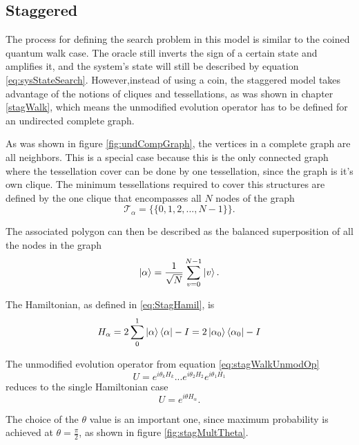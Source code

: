\documentclass[../../dissertation.tex]{subfiles}
\begin{document}
\subsection{Staggered}
The process for defining the search problem in this model is similar to the coined quantum walk case. The oracle still inverts the sign of a certain state and amplifies it, and the system's state will still be described by equation \ref{eq:sysStateSearch}. However,instead of using a coin, the staggered model takes advantage of the notions of cliques and tessellations, as was shown in chapter \ref{stagWalk}, which means the unmodified evolution operator has to be defined for an undirected complete graph.\par
As was shown in figure \ref{fig:undCompGraph}, the vertices in a complete graph are all neighbors. This is a special case because this is the only connected graph where the tessellation cover can be done by one tessellation, since the graph is it's own clique. The minimum tessellations required to cover this structures are defined by the one clique that encompasses all $N$ nodes of the graph
\begin{equation}
	\mathscr{T}_{\alpha} = \{\{0,1,2,...,N-1\}\}.
\end{equation}\par
The associated polygon can then be described as the balanced superposition of all the nodes in the graph
\begin{equation}
	\ket{\alpha} = \frac{1}{\sqrt{N}} \sum_{v=0}^{N-1} \ket{v}.
\end{equation}\par
The Hamiltonian, as defined in \ref{eq:StagHamil}, is 
\begin{equation}
	H_\alpha = 2\sum_0^1\ket{\alpha}\bra{\alpha} - I = 2\ket{\alpha_0}\bra{\alpha_0} - I
\end{equation}\par
The unmodified evolution operator from equation \ref{eq:stagWalkUnmodOp}
\begin{equation}
	U = e^{i\theta_{k}H_{k}}...e^{i\theta_{2}H_{2}}e^{i\theta_{1}H_{1}}
\end{equation}
reduces to the single Hamiltonian case
\begin{equation}
	U = e^{i\theta H_\alpha}.
	\label{eq:stagQWSearchUnmodEvo1}
\end{equation}\par
The choice of the $\theta$ value is an important one, since maximum probability is achieved at $\theta = \frac{\pi}{2}$, as shown in figure \ref{fig:stagMultTheta}.
\end{document}
